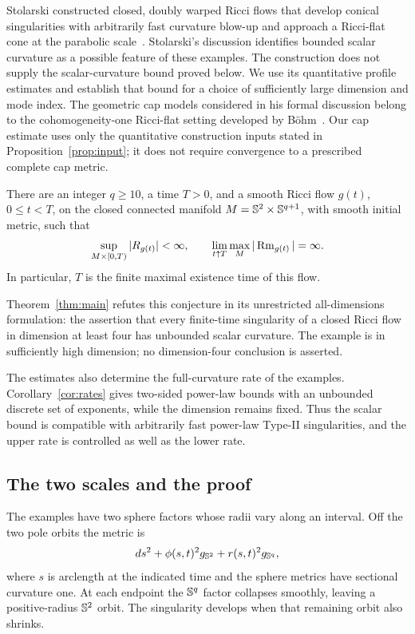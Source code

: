 Stolarski constructed closed, doubly warped Ricci flows that develop
conical singularities with arbitrarily fast curvature blow-up and approach
a Ricci-flat cone at the parabolic scale~\cite{Stolarski2019}.
Stolarski's discussion identifies bounded scalar curvature as a possible
feature of these examples. The construction does not supply the
scalar-curvature bound proved below.
We use its quantitative profile estimates and establish that bound for a
choice of sufficiently large dimension and mode index.
The geometric cap models considered in his formal discussion belong to
the cohomogeneity-one Ricci-flat setting developed by
B\"ohm~\cite{Bohm1999,Stolarski2019}. Our cap estimate uses only
the quantitative construction inputs stated in
Proposition~\ref{prop:input}; it does not require convergence to a
prescribed complete cap metric.

\begin{theorem}\label{thm:main}
There are an integer \(q\ge10\), a time \(T>0\), and a smooth Ricci flow
\(g(t)\), \(0\le t<T\), on the closed connected manifold
\(M=\mathbb S^2\times\mathbb S^{q+1}\), with smooth initial metric, such that
\[
\sup_{M\times[0,T)}|R_{g(t)}|<\infty,
\qquad
\lim_{t\uparrow T}\max_M|\operatorname{Rm}_{g(t)}|=\infty.
\]
In particular, \(T\) is the finite maximal existence time of this flow.
\end{theorem}

Theorem~\ref{thm:main} refutes this conjecture in its unrestricted
all-dimensions formulation: the assertion that every finite-time
singularity of a closed Ricci flow in dimension at least four has unbounded
scalar curvature. The example is in sufficiently high dimension; no
dimension-four conclusion is asserted.

The estimates also determine the full-curvature rate of the examples.
Corollary~\ref{cor:rates} gives two-sided power-law bounds with an unbounded
discrete set of exponents, while the dimension remains fixed. Thus the
scalar bound is compatible with arbitrarily fast power-law Type-II
singularities, and the upper rate is controlled as well as the lower rate.

\subsection*{The two scales and the proof}

The examples have two sphere factors whose radii vary along an interval.
Off the two pole orbits the metric is
\[
ds^2+\phi(s,t)^2g_{\mathbb S^2}+r(s,t)^2g_{\mathbb S^q},
\]
where \(s\) is arclength at the indicated time and the sphere metrics
have sectional curvature one. At each endpoint the \(\mathbb S^q\) factor
collapses smoothly, leaving a positive-radius \(\mathbb S^2\) orbit.
The singularity develops when that remaining orbit also shrinks.

